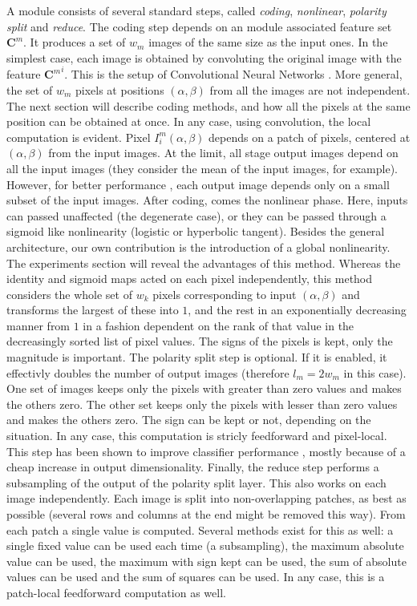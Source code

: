 \documentclass[12pt,a4paper,oneside,english]{UPBThesis}
\begin{document}
A module consists of several standard steps, called \emph{coding}, \emph{nonlinear}, \emph{polarity split} and \emph{reduce}. The coding step depends on an module associated feature set $\textbf{C}^m$. It produces a set of $w_m$ images of the same size as the input ones. In the simplest case, each image is obtained by convoluting the original image with the feature ${\textbf{C}^m}^i$. This is the setup of Convolutional Neural Networks \cite{gradient-based-learning}. More general, the set of $w_m$ pixels at positions $(\alpha,\beta)$ from all the images are not independent. The next section will describe coding methods, and how all the pixels at the same position can be obtained at once. In any case, using convolution, the local computation is evident. Pixel $I^m_i(\alpha,\beta)$ depends on a patch of pixels, centered at $(\alpha,\beta)$ from the input images. At the limit, all stage output images depend on all the input images (they consider the mean of the input images, for example). However, for better performance \cite{gradient-based-learning}, each output image depends only on a small subset of the input images. After coding, comes the nonlinear phase. Here, inputs can passed unaffected (the degenerate case), or they can be passed through a sigmoid like nonlinearity (logistic or hyperbolic tangent). Besides the general architecture, our own contribution is the introduction of a global nonlinearity. The experiments section will reveal the advantages of this method. Whereas the identity and sigmoid maps acted on each pixel independently, this method considers the whole set of $w_k$ pixels corresponding to input $(\alpha,\beta)$ and transforms the largest of these into $1$, and the rest in an exponentially decreasing manner from $1$ in a fashion dependent on the rank of that value in the decreasingly sorted list of pixel values. The signs of the pixels is kept, only the magnitude is important. The polarity split step is optional. If it is enabled, it effectivly doubles the number of output images (therefore $l_m = 2w_m$ in this case). One set of images keeps only the pixels with greater than zero values and makes the others zero. The other set keeps only the pixels with lesser than zero values and makes the others zero. The sign can be kept or not, depending on the situation. In any case, this computation is stricly feedforward and pixel-local. This step has been shown to improve classifier performance \cite{importance-encoding-sparse-coding-vq}, mostly because of a cheap increase in output dimensionality. Finally, the reduce step performs a subsampling of the output of the polarity split layer. This also works on each image independently. Each image is split into non-overlapping patches, as best as possible (several rows and columns at the end might be removed this way). From each patch a single value is computed. Several methods exist for this as well: a single fixed value can be used each time (a subsampling), the maximum absolute value can be used, the maximum with sign kept can be used, the sum of absolute values can be used and the sum of squares can be used. In any case, this is a patch-local feedforward computation as well.
\end{document}
